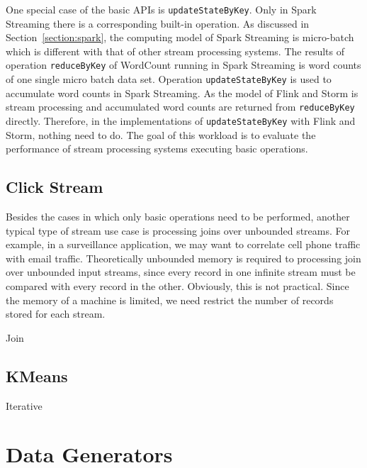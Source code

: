 One special case of the basic APIs is \texttt{updateStateByKey}. Only in Spark Streaming there is a corresponding built-in operation. As discussed in Section~\ref{section:spark}, the computing model of Spark Streaming is micro-batch which is different with that of other stream processing systems. The results of operation \texttt{reduceByKey} of WordCount running in Spark Streaming is word counts of one single micro batch data set. Operation \texttt{updateStateByKey} is used to accumulate word counts in Spark Streaming. As the model of Flink and Storm is stream processing and accumulated word counts are returned from \texttt{reduceByKey} directly. Therefore, in the implementations of \texttt{updateStateByKey} with Flink and Storm, nothing need to do. The goal of this workload is to evaluate the performance of stream processing systems executing basic operations.  


\subsection{Click Stream}

Besides the cases in which only basic operations need to be performed, another typical type of stream use case is processing joins over unbounded streams. For example, in a surveillance application, we may want to correlate cell phone traffic with email traffic. Theoretically unbounded memory is required to processing join over unbounded input streams, since every record in one infinite stream must be compared with every record in the other. Obviously, this is not practical. \cite{window-join} Since the memory of a machine is limited, we need restrict the number of records stored for each stream. 

Join



\subsection{KMeans}

Iterative 



\section{Data Generators}
\label{section:data_generator}


